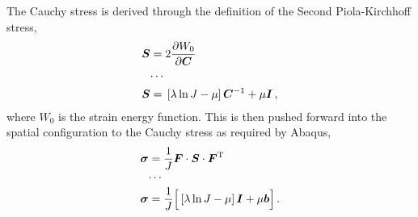 \documentclass[10pt,letterpaper,oneside]{report}
\newcommand{\ten}[1]{\mbox{\boldmath $#1$}{}}
\newcommand{\scas}[1]{\mbox{{\scriptsize{${\rm{#1}}$}}}{}}
\begin{document}
The Cauchy stress is derived through the definition of the Second Piola-Kirchhoff stress,
\begin{align}
\ten{S} ={}& 2 \frac{\partial W_0}{\partial \ten{C}}  
\\
\cdots{}& \notag \\
\ten{S} ={}& \left[ \lambda \ln J - \mu \right] \ten{C}^{-1} + \mu \ten{I} \, , 
\end{align}
where $W_0$ is the strain energy function.  This is then pushed forward into the spatial configuration to the Cauchy stress as required by Abaqus, 
\begin{align}
\ten{\sigma} ={}& \frac{1}{J} \ten{F} \cdot \ten{S} \cdot \ten{F}^{\scas{T}} 
\\
\cdots{}& \notag \\
\ten{\sigma} ={}& \frac{1}{J} \Big[ \left[ \lambda \ln J - \mu \right] \ten{I} + \mu \ten{b} \Big] \, . 
\end{align}
\end{document}
